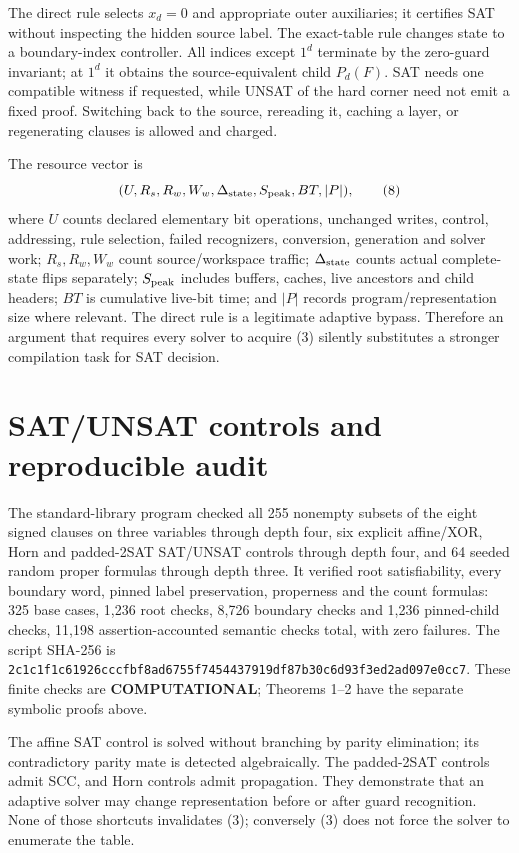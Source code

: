 \documentclass[11pt]{article}
\begin{document}
The direct rule selects $x_d=0$ and appropriate outer auxiliaries; it
certifies SAT without inspecting the hidden source label.  The exact-table
rule changes state to a boundary-index controller.  All indices except
$1^d$ terminate by the zero-guard invariant; at $1^d$ it obtains the
source-equivalent child $P_d(F)$.  SAT needs one compatible witness if
requested, while UNSAT of the hard corner need not emit a fixed proof.
Switching back to the source, rereading it, caching a layer, or regenerating
clauses is allowed and charged.

The resource vector is
\[
 (U,R_s,R_w,W_w,\Delta_{\rm state},S_{\rm peak},BT,|P|),           \tag{8}
\]
where $U$ counts declared elementary bit operations, unchanged writes,
control, addressing, rule selection, failed recognizers, conversion,
generation and solver work; $R_s,R_w,W_w$ count source/workspace traffic;
$\Delta_{\rm state}$ counts actual complete-state flips separately;
$S_{\rm peak}$ includes buffers, caches, live ancestors and child headers;
$BT$ is cumulative live-bit time; and $|P|$ records program/representation
size where relevant.  The direct rule is a legitimate adaptive bypass.
Therefore an argument that requires every solver to acquire (3) silently
substitutes a stronger compilation task for SAT decision.

\section{SAT/UNSAT controls and reproducible audit}
The standard-library program
 checked all 255
nonempty subsets of the eight signed clauses on three variables through
depth four, six explicit affine/XOR, Horn and padded-2SAT SAT/UNSAT
controls through depth four, and 64 seeded random proper formulas through
depth three.  It verified root satisfiability, every boundary word, pinned
label preservation, properness and the count formulas: 325 base cases,
1,236 root checks, 8,726 boundary checks and 1,236 pinned-child checks,
11,198 assertion-accounted semantic checks total, with zero failures.  The
script SHA-256 is
\texttt{2c1c1f1c61926cccfbf8ad6755f7454437919df87b30c6d93f3ed2ad097e0cc7}.
These finite checks are \textbf{COMPUTATIONAL}; Theorems 1--2 have the
separate symbolic proofs above.

The affine SAT control is solved without branching by parity elimination;
its contradictory parity mate is detected algebraically.  The padded-2SAT
controls admit SCC, and Horn controls admit propagation.  They demonstrate
that an adaptive solver may change representation before or after guard
recognition.  None of those shortcuts invalidates (3); conversely (3) does
not force the solver to enumerate the table.
\end{document}
